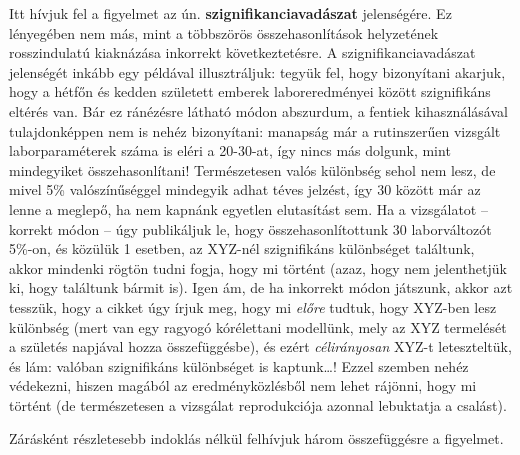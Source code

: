 \documentclass[
]{book}
\begin{document}
Itt hívjuk fel a figyelmet az ún. \textbf{szignifikanciavadászat} jelenségére. Ez lényegében nem más, mint a többszörös összehasonlítások helyzetének rosszindulatú kiaknázása inkorrekt következtetésre. A szignifikanciavadászat jelenségét inkább egy példával illusztráljuk: tegyük fel, hogy bizonyítani akarjuk, hogy a hétfőn és kedden született emberek laboreredményei között szignifikáns eltérés van. Bár ez ránézésre látható módon abszurdum, a fentiek kihasználásával tulajdonképpen nem is nehéz bizonyítani: manapság már a rutinszerűen vizsgált laborparaméterek száma is eléri a 20-30-at, így nincs más dolgunk, mint mindegyiket összehasonlítani! Természetesen valós különbség sehol nem lesz, de mivel 5\% valószínűséggel mindegyik adhat téves jelzést, így 30 között már az lenne a meglepő, ha nem kapnánk egyetlen elutasítást sem. Ha a vizsgálatot -- korrekt módon -- úgy publikáljuk le, hogy összehasonlítottunk 30 laborváltozót 5\%-on, és közülük 1 esetben, az XYZ-nél szignifikáns különbséget találtunk, akkor mindenki rögtön tudni fogja, hogy mi történt (azaz, hogy nem jelenthetjük ki, hogy találtunk bármit is). Igen ám, de ha inkorrekt módon játszunk, akkor azt tesszük, hogy a cikket úgy írjuk meg, hogy mi \emph{előre} tudtuk, hogy XYZ-ben lesz különbség (mert van egy ragyogó kórélettani modellünk, mely az XYZ termelését a születés napjával hozza összefüggésbe), és ezért \emph{célirányosan} XYZ-t leteszteltük, és lám: valóban szignifikáns különbséget is kaptunk\dots{}! Ezzel szemben nehéz védekezni, hiszen magából az eredményközlésből nem lehet rájönni, hogy mi történt (de természetesen a vizsgálat reprodukciója azonnal lebuktatja a csalást).

Zárásként részletesebb indoklás nélkül felhívjuk három összefüggésre a figyelmet.
\end{document}
